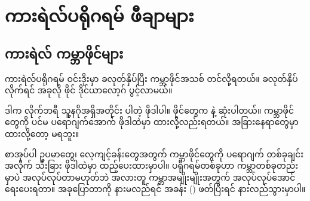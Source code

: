\chapter{ကားရဲလ်ပရိုဂရမ် ဖီချာများ}

\section*{ကားရဲလ် ကမ္ဘာဖိုင်များ}

ကားရဲလ်ပရိုဂရမ် ဝင်းဒိုးမှာ  ခလုတ်နှိပ်ပြီး ကမ္ဘာဖိုင်အသစ် တင်လို့ရတယ်။ ခလုတ်နှိပ်လိုက်ရင် အခုလို ဖိုင် ဒိုင်ယာလော့ဂ် ပွင့်လာမယ်။

\begin{figure}[tbh!]
\caption{} 
\label{fig:dftworlds}
\end{figure}

ဒါက  လိုက်ဘရီ သူ့နဂိုအရှိအတိုင်း ပါတဲ့  ဖိုဒါပါ။ ဖိုင်တွေက   နဲ့ ဆုံးပါတယ်။  ကမ္ဘာဖိုင်တွေကို ပင်မ ပရောဂျက်အောက်  ဖိုဒါထဲမှာ ထားလို့လည်းရတယ်။ အခြားနေရာတွေမှာ ထားလို့တော့ မရဘူး။

စာအုပ်ပါ ဥပမာတွေ၊ လေ့ကျင့်ခန်းတွေအတွက် ကမ္ဘာဖိုင်တွေကို ပရောဂျက် တစ်ခုချင်းအလိုက် သီးခြား  ဖိုဒါထဲမှာ ထည့်ပေးထားမှာပါ။ ပရိုဂရမ်တစ်ခုဟာ ကမ္ဘာတစ်ခုတည်းမှာပဲ အလုပ်လုပ်တာမဟုတ်ဘဲ အလားတူ ကမ္ဘာအမျိုးမျိုးအတွက် အလုပ်လုပ်အောင် ရေးပေးရတာ။ အခုပြောတာကို နားမလည်ရင် အခန်း (\fRefNo{\ref{ch:ch02}}) ဖတ်ပြီးရင် နားလည်သွားမှာပါ။

